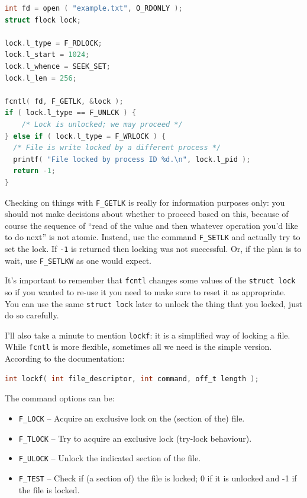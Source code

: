 \documentclass[a4paper]{report}
\begin{document}
\begin{lstlisting}[language=C]
int fd = open ( "example.txt", O_RDONLY );
struct flock lock;

lock.l_type = F_RDLOCK;
lock.l_start = 1024;
lock.l_whence = SEEK_SET;
lock.l_len = 256;

fcntl( fd, F_GETLK, &lock );
if ( lock.l_type == F_UNLCK ) {
	/* Lock is unlocked; we may proceed */
} else if ( lock.l_type = F_WRLOCK ) {
  /* File is write locked by a different process */
  printf( "File locked by process ID %d.\n", lock.l_pid );
  return -1;
}
\end{lstlisting}

Checking on things with \texttt{F\_GETLK} is really for information purposes only: you should not make decisions about whether to proceed based on this, because of course the sequence of ``read of the value and then whatever operation you'd like to do next'' is not atomic. Instead, use the command \texttt{F\_SETLK} and actually try to set the lock. If \texttt{-1} is returned then locking was not successful. Or, if the plan is to wait, use \texttt{F\_SETLKW} as one would expect.

It's important to remember that \texttt{fcntl} changes some values of the \texttt{struct lock} so if you wanted to re-use it you need to make sure to reset it as appropriate. You can use the same \texttt{struct lock} later to unlock the thing that you locked, just do so carefully.

I'll also take a minute to mention \texttt{lockf}: it is a simplified way of locking a file. While \texttt{fcntl} is more flexible, sometimes all we need is the simple version. According to the documentation:

\begin{lstlisting}[language=C]
int lockf( int file_descriptor, int command, off_t length );
\end{lstlisting}

The command options can be:
\begin{itemize}
	\item \texttt{F\_LOCK} -- Acquire an exclusive lock on the (section of the) file.
	\item \texttt{F\_TLOCK} -- Try to acquire an exclusive lock (try-lock behaviour).
	\item \texttt{F\_ULOCK} -- Unlock the indicated section of the file.
	\item \texttt{F\_TEST} -- Check if (a section of) the file is locked; 0 if it is unlocked and -1 if the file is locked.
\end{itemize}
\end{document}
